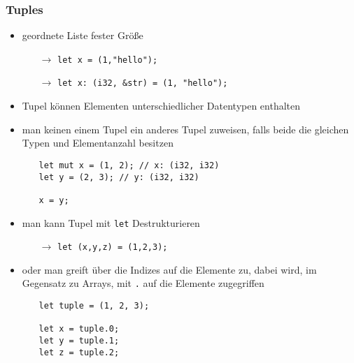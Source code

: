 \documentclass[a4paper,12pt]{article}
\begin{document}
\subsubsection*{Tuples}
	\begin{itemize}
	  \item geordnete Liste fester Größe
	  \begin{itemize}
	      \item[$\rightarrow$] \verb|let x = (1,"hello");| 
		  \item[$\rightarrow$] \verb|let x: (i32, &str) = (1, "hello");| 
	  \end{itemize}
	  \item Tupel können Elementen unterschiedlicher Datentypen enthalten
	  \item man keinen einem Tupel ein anderes Tupel zuweisen, falls beide die gleichen Typen und Elementanzahl besitzen
	  \begin{itemize}
	  \item[]
\begin{verbatim}
let mut x = (1, 2); // x: (i32, i32)
let y = (2, 3); // y: (i32, i32)

x = y;
\end{verbatim}
	  \end{itemize}
	 \item man kann Tupel mit \verb|let| Destrukturieren 
	 \begin{itemize}
	     \item[$\rightarrow$] \verb|let (x,y,z) = (1,2,3);| 
	 \end{itemize}
	 \item oder man greift über die Indizes auf die Elemente zu, dabei wird, im Gegensatz zu Arrays, mit \verb|.| auf die Elemente zugegriffen
	 \begin{itemize}
	     \item[]
	     \begin{verbatim}
let tuple = (1, 2, 3);

let x = tuple.0;
let y = tuple.1;
let z = tuple.2;	     
		 \end{verbatim}	      
	 \end{itemize}
	\end{itemize}
	
\end{document}
